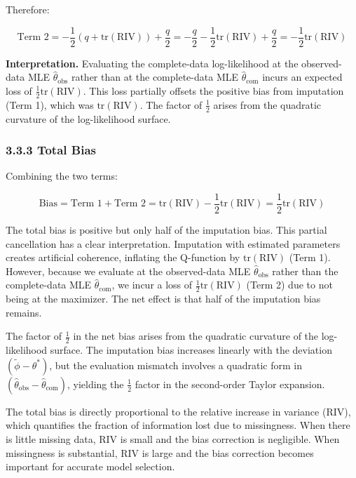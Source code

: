 \documentclass[
]{article}
\begin{document}
Therefore:

\[\text{Term 2} = -\frac{1}{2}\left(q + \text{tr}(\text{RIV})\right) + \frac{q}{2} = -\frac{q}{2} - \frac{1}{2}\text{tr}(\text{RIV}) + \frac{q}{2} = -\frac{1}{2}\text{tr}(\text{RIV})\]

\textbf{Interpretation.} Evaluating the complete-data log-likelihood at
the observed-data MLE \(\hat{\theta}_{\text{obs}}\) rather than at the
complete-data MLE \(\hat{\theta}_{\text{com}}\) incurs an expected loss
of \(\frac{1}{2}\text{tr}(\text{RIV})\). This loss partially offsets the
positive bias from imputation (Term 1), which was
\(\text{tr}(\text{RIV})\). The factor of \(\frac{1}{2}\) arises from the
quadratic curvature of the log-likelihood surface.

\subsubsection{3.3.3 Total Bias}\label{total-bias}

Combining the two terms:

\[\text{Bias} = \text{Term 1} + \text{Term 2} = \text{tr}(\text{RIV}) - \frac{1}{2}\text{tr}(\text{RIV}) = \frac{1}{2}\text{tr}(\text{RIV})\]

The total bias is positive but only half of the imputation bias. This
partial cancellation has a clear interpretation. Imputation with
estimated parameters creates artificial coherence, inflating the
Q-function by \(\text{tr}(\text{RIV})\) (Term 1). However, because we
evaluate at the observed-data MLE \(\hat{\theta}_{\text{obs}}\) rather
than the complete-data MLE \(\hat{\theta}_{\text{com}}\), we incur a
loss of \(\frac{1}{2}\text{tr}(\text{RIV})\) (Term 2) due to not being
at the maximizer. The net effect is that half of the imputation bias
remains.

The factor of \(\frac{1}{2}\) in the net bias arises from the quadratic
curvature of the log-likelihood surface. The imputation bias increases
linearly with the deviation \((\tilde{\phi} - \theta^*)\), but the
evaluation mismatch involves a quadratic form in
\((\hat{\theta}_{\text{obs}} - \hat{\theta}_{\text{com}})\), yielding
the \(\frac{1}{2}\) factor in the second-order Taylor expansion.

The total bias is directly proportional to the relative increase in
variance (RIV), which quantifies the fraction of information lost due to
missingness. When there is little missing data, RIV is small and the
bias correction is negligible. When missingness is substantial, RIV is
large and the bias correction becomes important for accurate model
selection.
\end{document}
